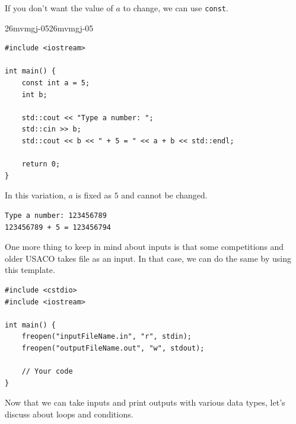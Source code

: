 \documentclass[../../../main.tex]{subfiles}
\begin{document}
If you don't want the value of $a$ to change, we can use \verb|const|.

\begin{cppbox}{26mvmgj-05}{26mvmgj-05}
\begin{lstlisting}[style=cppstyle]
#include <iostream>

int main() {
    const int a = 5;
    int b;

    std::cout << "Type a number: ";
    std::cin >> b;
    std::cout << b << " + 5 = " << a + b << std::endl;
    
    return 0;
}
\end{lstlisting}
\end{cppbox}

In this variation, $a$ is fixed as $5$ and cannot be changed.

\begin{outputbox}
\begin{lstlisting}[style=basic]
Type a number: 123456789
123456789 + 5 = 123456794
\end{lstlisting}
\end{outputbox}

One more thing to keep in mind about inputs is that some competitions
and older USACO takes file as an input. In that case, we can do the
same by using this template.

\begin{basicbox}
\begin{lstlisting}[style=cppstyle]
#include <cstdio>
#include <iostream>

int main() {
    freopen("inputFileName.in", "r", stdin);
    freopen("outputFileName.out", "w", stdout);

    // Your code
}
\end{lstlisting}
\end{basicbox}

Now that we can take inputs and print outputs with various data types,
let's discuss about loops and conditions.
\end{document}
